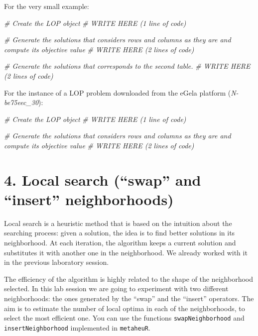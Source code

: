 \documentclass[
]{article}
\newenvironment{Shaded}{\begin{snugshade}}{\end{snugshade}}
\newcommand{\CommentTok}[1]{\textcolor[rgb]{0.56,0.35,0.01}{\textit{#1}}}
\begin{document}
For the very small example:

\begin{Shaded}
\begin{Highlighting}[]
\CommentTok{\# Create the LOP object }
\CommentTok{\# WRITE HERE (1 line of code)}




\CommentTok{\# Generate the solutions that considers rows and columns as they are and compute its objective value}
\CommentTok{\# WRITE HERE (2 lines of code)}








\CommentTok{\# Generate the solutions that corresponds to the second table.}
\CommentTok{\# WRITE HERE (2 lines of code)}
\end{Highlighting}
\end{Shaded}

For the instance of a LOP problem downloaded from the eGela platform
(\emph{N-be75eec\_30}):

\begin{Shaded}
\begin{Highlighting}[]
\CommentTok{\# Create the LOP object}
\CommentTok{\# WRITE HERE (1 line of code)}





\CommentTok{\# Generate the solutions that considers rows and columns as they are and compute its objective value}
\CommentTok{\# WRITE HERE (2 lines of code)}
\end{Highlighting}
\end{Shaded}

\hypertarget{local-search-swap-and-insert-neighborhoods}{%
\section{4. Local search (``swap'' and ``insert''
neighborhoods)}\label{local-search-swap-and-insert-neighborhoods}}

Local search is a heuristic method that is based on the intuition about
the searching process: given a solution, the idea is to find better
solutions in its neighborhood. At each iteration, the algorithm keeps a
current solution and substitutes it with another one in the
neighborhood. We already worked with it in the previous laboratory
session.

The efficiency of the algorithm is highly related to the shape of the
neighborhood selected. In this lab session we are going to experiment
with two different neighborhoods: the ones generated by the ``swap'' and
the ``insert'' operators. The aim is to estimate the number of local
optima in each of the neighborhoods, to select the most efficient one.
You can use the functions \texttt{swapNeighborhood} and
\texttt{insertNeighborhood} implemented in \texttt{metaheuR}.
\end{document}
